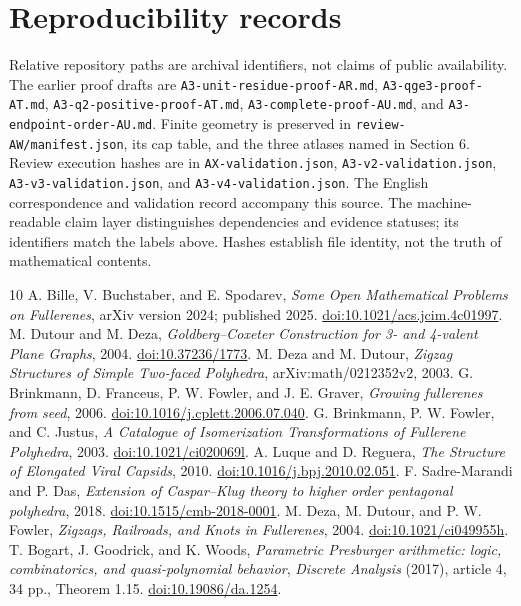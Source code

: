 \documentclass[11pt]{amsart}
\newcommand{\record}[1]{\nolinkurl{#1}}
\begin{document}
\section*{Reproducibility records}
Relative repository paths are archival identifiers, not claims of
public availability. The earlier proof drafts are
\record{A3-unit-residue-proof-AR.md}, \record{A3-qge3-proof-AT.md},
\record{A3-q2-positive-proof-AT.md}, \record{A3-complete-proof-AU.md},
and \record{A3-endpoint-order-AU.md}. Finite geometry is preserved in
\record{review-AW/manifest.json}, its cap table, and the three atlases
named in Section 6. Review execution hashes are in
\record{AX-validation.json}, \record{A3-v2-validation.json},
\record{A3-v3-validation.json}, and \record{A3-v4-validation.json}.
The English correspondence and validation record accompany this source.
The machine-readable claim layer distinguishes dependencies and
evidence statuses; its identifiers match the labels above. Hashes
establish file identity, not the truth of mathematical contents.

\clearpage
\begin{thebibliography}{10}
 A. Bille, V. Buchstaber, and E. Spodarev,
\emph{Some Open Mathematical Problems on Fullerenes}, arXiv version
2024; published 2025. \href{https://doi.org/10.1021/acs.jcim.4c01997}{doi:10.1021/acs.jcim.4c01997}.
 M. Dutour and M. Deza,
\emph{Goldberg--Coxeter Construction for 3- and 4-valent Plane Graphs},
2004. \href{https://doi.org/10.37236/1773}{doi:10.37236/1773}.
 M. Deza and M. Dutour,
\emph{Zigzag Structures of Simple Two-faced Polyhedra},
arXiv:math/0212352v2, 2003.
 G. Brinkmann, D. Franceus, P. W. Fowler, and J. E. Graver,
\emph{Growing fullerenes from seed}, 2006.
\href{https://doi.org/10.1016/j.cplett.2006.07.040}{doi:10.1016/j.cplett.2006.07.040}.
 G. Brinkmann, P. W. Fowler, and C. Justus,
\emph{A Catalogue of Isomerization Transformations of Fullerene Polyhedra},
2003. \href{https://doi.org/10.1021/ci020069l}{doi:10.1021/ci020069l}.
 A. Luque and D. Reguera,
\emph{The Structure of Elongated Viral Capsids}, 2010.
\href{https://doi.org/10.1016/j.bpj.2010.02.051}{doi:10.1016/j.bpj.2010.02.051}.
 F. Sadre-Marandi and P. Das,
\emph{Extension of Caspar--Klug theory to higher order pentagonal polyhedra},
2018. \href{https://doi.org/10.1515/cmb-2018-0001}{doi:10.1515/cmb-2018-0001}.
 M. Deza, M. Dutour, and P. W. Fowler,
\emph{Zigzags, Railroads, and Knots in Fullerenes}, 2004.
\href{https://doi.org/10.1021/ci049955h}{doi:10.1021/ci049955h}.
 T. Bogart, J. Goodrick, and K. Woods,
\emph{Parametric Presburger arithmetic: logic, combinatorics, and
quasi-polynomial behavior}, \emph{Discrete Analysis} (2017),
article 4, 34 pp., Theorem 1.15.
\href{https://doi.org/10.19086/da.1254}{doi:10.19086/da.1254}.
\end{thebibliography}
\end{document}
